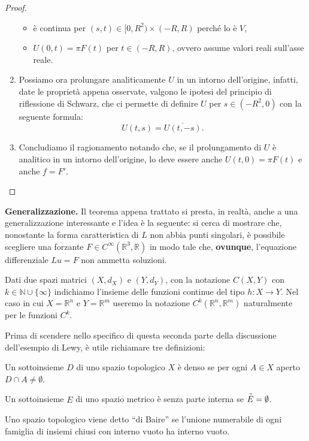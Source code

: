 \begin{proof}
\begin{enumerate}[1.]
\begin{itemize}
\item
è continua per $(s,t) \in [0,R^2) \times (-R,R)$ perché lo è $V$,
\item
$U(0,t)=\pi F(t)$ per $t\in (-R,R)$, ovvero assume valori reali sull'asse reale.
\end{itemize}
\item
Possiamo ora prolungare analiticamente $U$ in un intorno dell'origine, infatti, 
date le proprietà appena osservate, valgono le ipotesi del principio di riflessione di Schwarz, che ci permette 
di definire $U$ per $s\in (-R^2,0)$ con la seguente formula: $$U(t,s)=\overline{U(t,-s)}.$$
\item
Concludiamo il ragionamento notando che, se il prolungamento di $U$ è analitico in un intorno dell'origine, lo deve essere anche $U(t,0)=\pi F(t)$ e anche $f=F'$. \qedhere
\end{enumerate}
\end{proof}

\textbf{Generalizzazione.} Il teorema appena trattato si presta, in realtà, anche a una generalizzazione interessante e l'idea è la seguente: si cerca di mostrare che, nonostante la forma caratteristica di $L$ non abbia punti singolari, è possibile scegliere una forzante $F \in C^{\infty} (\mathbb{R}^3, \mathbb{R})$ in modo tale che, \textbf{ovunque}, l'equazione differenziale $Lu=F$ non ammetta soluzioni.

\begin{remark}
Dati due spazi matrici $(X,d_X)$ e $(Y,d_Y)$, con la notazione $C(X,Y)$ con $k \in \mathbb{N} \cup \{\infty\}$ indichiamo l'insieme delle funzioni continue del tipo $h:X \rightarrow Y$. Nel caso in cui $X=\mathbb{R}^n$ e $Y=\mathbb{R}^m$ useremo la notazione $C^k(\mathbb{R}^n,\mathbb{R}^m)$ naturalmente per le funzioni $C^k$.
\end{remark}

Prima di scendere nello specifico di questa seconda parte della discussione dell'esempio di Lewy, è utile richiamare tre definizioni:
\begin{definition}
Un sottoinsieme $D$ di uno spazio topologico $X$ è denso se per ogni $ A \in X$ aperto $D \cap A \neq \emptyset $.
\end{definition}
\begin{definition}
Un sottoinsieme $E$ di uno spazio metrico è senza parte interna se $\accentset{\circ}{E}=\emptyset$.
\end{definition}
\begin{definition}
Uno spazio topologico viene detto ``di Baire'' se l'unione numerabile di ogni famiglia di insiemi chiusi con interno vuoto ha interno vuoto.
\end{definition}

